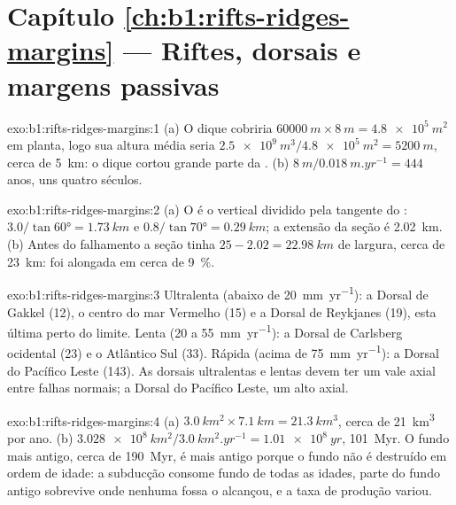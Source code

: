 \section*{Capítulo \ref{ch:b1:rifts-ridges-margins} --- Riftes, dorsais e margens passivas}

\begin{solution}{exo:b1:rifts-ridges-margins:1}
(a) O dique cobriria $\qty{60000}{m}\times\qty{8}{m} = \qty{4.8e5}{m^2}$ em
planta, logo sua altura média seria $\qty{2.5e9}{m^3}/\qty{4.8e5}{m^2} =
\qty{5200}{m}$, cerca de \qty{5}{km}: o dique cortou grande parte da .
(b) $\qty{8}{m}/\qty{0.018}{m.yr^{-1}} = 444$ anos, uns quatro séculos.
\end{solution}

\begin{solution}{exo:b1:rifts-ridges-margins:2}
(a) O  é o  vertical dividido pela tangente do :
$3.0/\tan\ang{60} = \qty{1.73}{km}$ e $0.8/\tan\ang{70} = \qty{0.29}{km}$;
a extensão da seção é \qty{2.02}{km}. (b) Antes do falhamento a seção tinha
$25 - 2.02 = \qty{22.98}{km}$ de largura, cerca de \qty{23}{km}: foi alongada em
cerca de \qty{9}{\percent}.
\end{solution}

\begin{solution}{exo:b1:rifts-ridges-margins:3}
Ultralenta (abaixo de \qty{20}{mm.yr^{-1}}): a Dorsal de Gakkel (12), o centro do
mar Vermelho (15) e a Dorsal de Reykjanes (19), esta última perto do limite. Lenta (20 a
\qty{55}{mm.yr^{-1}}): a Dorsal de Carlsberg ocidental (23) e o Atlântico Sul
(33). Rápida (acima de \qty{75}{mm.yr^{-1}}): a Dorsal do Pacífico Leste (143). As
dorsais ultralentas e lentas devem ter um vale axial entre falhas normais; a Dorsal do
Pacífico Leste, um alto axial.
\end{solution}

\begin{solution}{exo:b1:rifts-ridges-margins:4}
(a) $\qty{3.0}{km^2}\times\qty{7.1}{km} = \qty{21.3}{km^3}$, cerca de
\qty{21}{km^3} por ano. (b) $\qty{3.028e8}{km^2}/\qty{3.0}{km^2.yr^{-1}} =
\qty{1.01e8}{yr}$, \qty{101}{Myr}. O fundo mais antigo, cerca de \qty{190}{Myr}, é
mais antigo porque o fundo não é destruído em ordem de idade: a subducção consome
fundo de todas as idades, parte do fundo antigo sobrevive onde nenhuma fossa o alcançou,
e a taxa de produção variou.
\end{solution}

